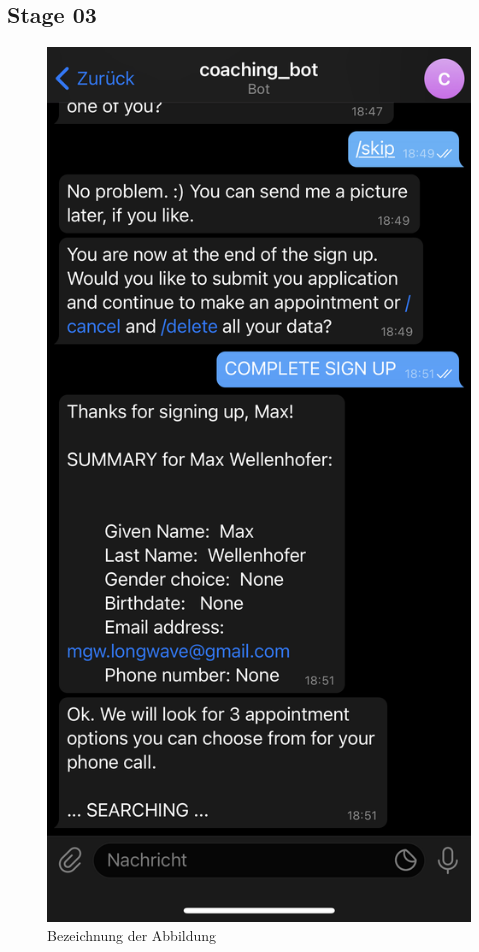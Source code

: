 \subsection{Stage 03}
\begin{figure} %
	\centering
	\includegraphics{images/coaching_bot_dummy_screenshot.jpeg}
	\caption{Bezeichnung der Abbildung}
	\label{a4}
\end{figure}


